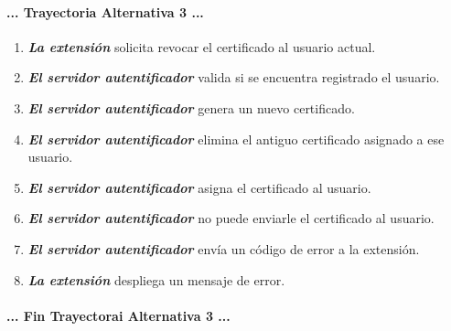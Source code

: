 \documentclass[12pt, a4paper, titlepage]{report}
\begin{document}
    		\paragraph{... Trayectoria Alternativa 3 ...}
    		\begin{enumerate}
    		    \item \textbf{\textit{La extensión}} solicita revocar el certificado al usuario actual.
    		    
    		    \item \textbf{\textit{El servidor autentificador}} valida si se encuentra registrado el usuario.
    		    
    		    \item \textbf{\textit{El servidor autentificador}} genera un nuevo certificado.
    		    
    		    \item \textbf{\textit{El servidor autentificador}} elimina el antiguo certificado asignado a ese usuario.
    		    
    		    \item \textbf{\textit{El servidor autentificador}} asigna el certificado al usuario.
    		    
    		    \item \textbf{\textit{El servidor autentificador}} no puede enviarle el certificado al usuario.
    		    
    		    \item \textbf{\textit{El servidor autentificador}} envía un código de error a la extensión.
    		    
    		    \item \textbf{\textit{La extensión}} despliega un mensaje de error.
    		\end{enumerate}
    		\paragraph{... Fin Trayectorai Alternativa 3 ...}
    		\newpage
		
		
		
\end{document}
